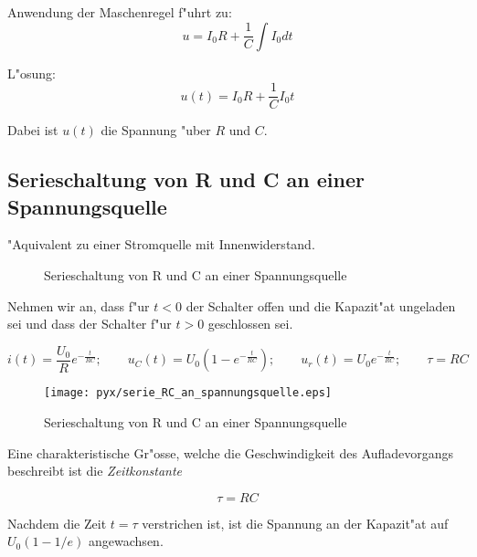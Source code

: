 \documentclass[german, 10pt, a4paper, headsepline]{scrreprt}
\theoremstyle{remark}
\begin{document}
Anwendung der Maschenregel f"uhrt zu:
\begin{displaymath}
	u = I_0 R + \frac{1}{C}\int I_0 dt
\end{displaymath}

L"osung:
\begin{displaymath}
	u(t) = I_0R + \frac{1}{C}I_0t
\end{displaymath}

Dabei ist $u(t)$ die Spannung "uber $R$ und $C$.

\subsection{Serieschaltung von R und C an einer Spannungsquelle}

"Aquivalent zu einer Stromquelle mit Innenwiderstand.

\begin{figure}[hbt]
 
 \centerline{\box\graph}
 \caption{Serieschaltung von R und C an einer Spannungsquelle}
 \label{RC_Serie}
\end{figure}

Nehmen wir an, dass f"ur $t<0$ der Schalter offen und die Kapazit"at ungeladen sei und dass der Schalter f"ur $t>0$ geschlossen sei.

\begin{displaymath}
	i(t)=\frac{U_0}{R}e^{-\frac{t}{RC}};\qquad u_C(t) = U_0(1-e^{-\frac{t}{RC}});\qquad u_r(t)=U_0e^{-\frac{t}{RC}};\qquad \tau = RC
\end{displaymath}

\begin{figure}[hbt]
 \begin{center}
	\texttt{[image: pyx/serie\_RC\_an\_spannungsquelle.eps]}
 \end{center}
 \caption{Serieschaltung von R und C an einer Spannungsquelle}
 \label{serie_RC_an_spannungsquelle}
\end{figure}

Eine charakteristische Gr"osse, welche die Geschwindigkeit des Aufladevorgangs beschreibt ist die \textit{Zeitkonstante} 

\begin{displaymath}
	\tau=RC
\end{displaymath}

Nachdem die Zeit $t=\tau$ verstrichen ist, ist die Spannung an der Kapazit"at auf $U_0(1-1/e)$ angewachsen.\\
\end{document}
